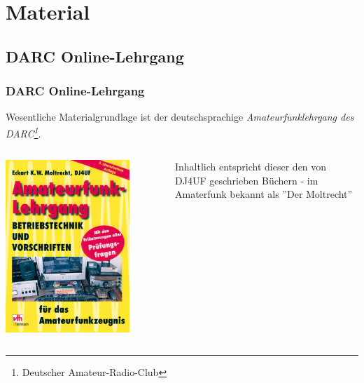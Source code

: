 \section{Material}

\subsection[DARC-Lehrgang]{DARC Online-Lehrgang}

\begin{frame}
    \frametitle{DARC Online-Lehrgang}

    Wesentliche Materialgrundlage ist der deutschsprachige
    \emph{Amateurfunklehrgang\hyperlink{refs}{\cite{darc}} des
    DARC\footnote{Deutscher Amateur-Radio-Club}}.

    \begin{columns}[c]
        \column[c]{5cm}
        \begin{center}
            \includegraphics[width=0.8\textwidth]{e00/Amateurfunklehrgang-Betriebstechnik-und-Vorschriften.jpg}
            \tiny \hyperlink{refs}{\cite{darcv}}
        \end{center}
        \column{5cm}
            Inhaltlich entspricht dieser den von DJ4UF geschrieben Büchern - im
            Amaterfunk bekannt als ''Der Moltrecht''\hyperlink{refs}{\cite{dj4uf}}
    \end{columns}

\end{frame}


